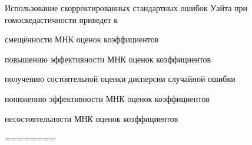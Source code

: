 
\begin{question}
Использование скорректированных стандартных ошибок Уайта при
гомоскедастичности приведет к
\begin{answerlist}
  \item смещённости МНК оценок коэффициентов
  \item повышению эффективности МНК оценок коэффициентов
  \item получению состоятельной оценки дисперсии случайной ошибки
  \item понижению эффективности МНК оценок коэффициентов
  \item несостоятельности МНК оценок коэффициентов
\end{answerlist}
\end{question}

\begin{solution}
========
\end{solution}

